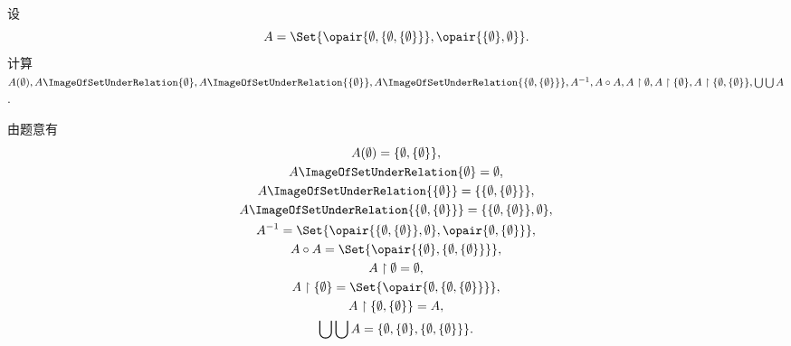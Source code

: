 \begin{example}
设\begin{equation*}
	A = \Set{
		\opair{\emptyset,\{\emptyset,\{\emptyset\}\}},
		\opair{\{\emptyset\},\emptyset}
	}.
\end{equation*}
计算\(A(\emptyset),
A\ImageOfSetUnderRelation{\emptyset},
A\ImageOfSetUnderRelation{\{\emptyset\}},
A\ImageOfSetUnderRelation{\{\emptyset,\{\emptyset\}\}},
A^{-1},
A \circ A,
A \SetRestrict \emptyset,
A \SetRestrict \{\emptyset\},
A \SetRestrict \{\emptyset,\{\emptyset\}\},
\bigcup\bigcup A\).
\begin{solution}
由题意有\begin{gather*}
	A(\emptyset)
	= \{\emptyset,\{\emptyset\}\}, \\
	A\ImageOfSetUnderRelation{\emptyset}
	= \emptyset, \\
	A\ImageOfSetUnderRelation{\{\emptyset\}}
	= \{\{\emptyset,\{\emptyset\}\}\}, \\
	A\ImageOfSetUnderRelation{\{\emptyset,\{\emptyset\}\}}
	= \{\{\emptyset,\{\emptyset\}\},\emptyset\}, \\
	A^{-1}
	= \Set{
		\opair{\{\emptyset,\{\emptyset\}\},\emptyset},
		\opair{\emptyset,\{\emptyset\}}
	}, \\
	A \circ A
	= \Set{
		\opair{\{\emptyset\},\{\emptyset,\{\emptyset\}\}}
	}, \\
	A \SetRestrict \emptyset
	= \emptyset, \\
	A \SetRestrict \{\emptyset\}
	= \Set{
		\opair{\emptyset,\{\emptyset,\{\emptyset\}\}}
	}, \\
	A \SetRestrict \{\emptyset,\{\emptyset\}\}
	= A, \\
	\bigcup\bigcup A
	= \{
		\emptyset,
		\{\emptyset\},
		\{\emptyset,\{\emptyset\}\}
	\}.
\end{gather*}
\end{solution}
\end{example}


